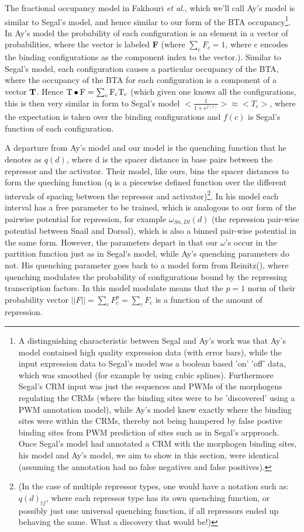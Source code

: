 The fractional occupancy model in Fakhouri \textit{et al.}\cite{pmid20087339}, which we'll call Ay's model is similar to Segal's model, and hence similar to our form of the BTA occupancy\footnote{A distinguishing characteristic between Segal and Ay's work was that Ay's model contained high quality expression data (with error bars)\cite{}, while the input expression data to Segal's model was a boolean based 'on' 'off' data, which was smoothed (for example by using cubic splines).  Furthermore Segal's CRM input was just the sequences and PWMs of the morphogens regulating the CRMs (where the binding sites were to be 'discovered' using a PWM annotation model), while Ay's model knew exactly where the binding sites were within the CRMs, thereby not being hampered by false postive binding sites from PWM prediction of sites such as in Segal's arpproach.  Once Segal's model had annotated a CRM with the morphogen binding sites, his model and Ay's model, we aim to show in this section, were identical (assuming the annotation had no false negatives and false positives).}.  In Ay's model the probability of each configuration is an element in a vector of probabilities, where the vector is labeled \textbf{F} (where $\sum_c F_c =1$, where c encodes the binding configurations as the component index to the vector.).  Similar to Segal's model, each configuration causes a particular occupancy of the BTA, where the occupancy of the BTA for each configuration is a component of a vector $\rm \textbf{T}$.  Hence $ \rm \bm{T} \bullet \rm \bm{F} = \sum_c F_c T_c $ (which given one knows all the configurations, this is then very similar in form to Segal's model $<\frac{1}{1+e^{f(c)}}> \approx < T_c >$, where the expectation is taken over the binding configurations and $f(c)$ is Segal's function of each configuration.

A departure from Ay's model and our model is the quenching function that he denotes as $q(d)$, where d is the spacer distance in base pairs between the repressor and the activator.  Their model, like ours, bins the spacer distances to form the queching function (q is a piecewise defined function over the different intervals of spacing between the repressor and activator)\footnote{  (In the case of multiple repressor types, one would have a notation such as: $q(d)_{tf}$, where each repressor type has its own quenching function, or possibly just one universal quenching function, if all repressors ended up behaving the same.  What a discovery that would be!) }.  In his model each interval has a free parameter to be trained, which is analogous to our form of the pairwise potential for repression, for example $\omega_{Sn,Dl}(d)$ (the repression pair-wise potential between Snail and Dorsal), which is also a binned pair-wise potential in the same form.  However, the parameters depart in that our $\omega$'s occur in the partition function just as in Segal's model, while Ay's quenching parameters do not.  His quenching parameter goes back to a model form from Reinitz(\cite{perplexus}), where quenching modulates the probability of configurations bound by the repressing transcription factors.  In this model modulate means that the $p=1$ norm of their probability vector $ ||F|| = \sum_c F_c^{p}=\sum_c F_c$ is a function of the amount of repression. 

